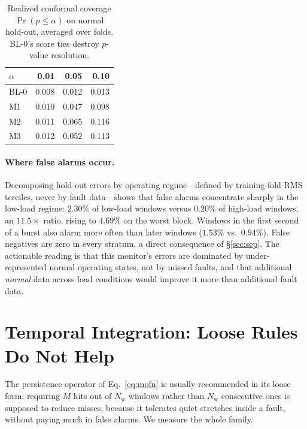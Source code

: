 \documentclass{article}
\begin{document}
\begin{table}[t]
\caption{Realized conformal coverage $\Pr(p \le \alpha)$ on normal hold-out,
averaged over folds. BL-0's score ties destroy $p$-value resolution.}
\label{tab:e8}
\vskip 0.08in
\centering
\small
\begin{tabular}{lrrr}
\toprule
$\alpha$ & 0.01 & 0.05 & 0.10 \\
\midrule
BL-0 & 0.008 & 0.012 & 0.013 \\
M1   & 0.010 & 0.047 & 0.098 \\
M2   & 0.011 & 0.065 & 0.116 \\
M3   & 0.012 & 0.052 & 0.113 \\
\bottomrule
\end{tabular}
\end{table}

\paragraph{Where false alarms occur.} Decomposing hold-out errors by operating
regime---defined by training-fold RMS terciles, never by fault data---shows
that false alarms concentrate sharply in the low-load regime: $2.30\%$ of
low-load windows versus $0.20\%$ of high-load windows, an $11.5\times$ ratio,
rising to $4.69\%$ on the worst block. Windows in the first second of a burst
also alarm more often than later windows ($1.53\%$ vs.\ $0.94\%$). False
negatives are zero in every stratum, a direct consequence of
\S\ref{sec:sep}. The actionable reading is that this monitor's errors are
dominated by under-represented normal operating states, not by missed faults,
and that additional \emph{normal} data across load conditions would improve it
more than additional fault data.

\section{Temporal Integration: Loose Rules Do Not Help}
\label{sec:mofn}

The persistence operator of Eq.~\ref{eq:mofn} is usually recommended in its
loose form: requiring $M$ hits out of $N_{\mathrm w}$ windows rather than
$N_{\mathrm w}$ consecutive ones is supposed to reduce misses, because it
tolerates quiet stretches inside a fault, without paying much in false alarms.
We measure the whole family.
\end{document}
